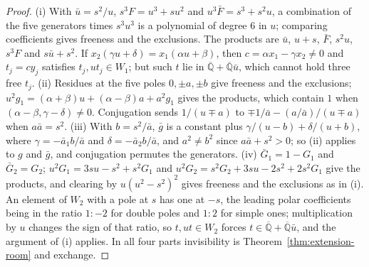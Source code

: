 \documentclass[11pt,a4paper]{article}
\theoremstyle{plain}
\theoremstyle{definition}
\newcommand{\Alg}{\overline{\mathbb{Q}}}
\begin{document}
\begin{proof}
(i) With $\bar u=s^{2}/u$, $s^{3}F=u^{3}+su^{2}$ and $u^{3}\bar F=s^{3}+s^{2}u$, a combination of the five generators
times $s^{3}u^{3}$ is a polynomial of degree $6$ in $u$; comparing coefficients gives freeness and the exclusions.
The products are $\bar u$, $u+s$, $\bar F$, $s^{2}u$, $s^{3}F$ and $s\bar u+s^{2}$. If $x_{2}(\gamma u+\delta)=
x_{1}(\alpha u+\beta)$, then $c=\alpha x_{1}-\gamma x_{2}\neq0$ and $t_{j}=cy_{j}$ satisfies $t_{j},ut_{j}\in W_{1}$;
but such $t$ lie in $\Alg+\Alg\bar u$, which cannot hold three free $t_{j}$. (ii) Residues at the five poles
$0,\pm a,\pm b$ give freeness and the exclusions; $u^{2}g_{1}=(\alpha+\beta)u+(\alpha-\beta)a+a^{2}g_{1}$ gives the
products, which contain $1$ when $(\alpha-\beta,\gamma-\delta)\neq0$. Conjugation sends $1/(u\mp a)$ to
$\mp1/\bar a-(a/\bar a)/(u\mp a)$ when $a\bar a=s^{2}$. (iii) With $b=s^{2}/\bar a$, $\bar g$ is a constant plus
$\gamma/(u-b)+\delta/(u+b)$, where $\gamma=-\bar a_{1}b/\bar a$ and $\delta=-\bar a_{2}b/\bar a$, and $a^{2}\neq b^{2}$
since $a\bar a+s^{2}>0$; so (ii) applies to $g$ and $\bar g$, and conjugation permutes the generators.
(iv) $\bar G_{1}=1-G_{1}$ and $\bar G_{2}=G_{2}$; $u^{2}G_{1}=3su-s^{2}+s^{2}G_{1}$ and
$u^{2}G_{2}=s^{2}G_{2}+3su-2s^{2}+2s^{2}G_{1}$ give the products, and clearing by $u(u^{2}-s^{2})^{2}$ gives
freeness and the exclusions as in (i). An element of $W_{2}$ with a pole at $s$ has one at $-s$, the leading
polar coefficients being in the ratio $1:-2$ for double poles and $1:2$ for simple ones; multiplication by $u$
changes the sign of that ratio, so $t,ut\in W_{2}$ forces $t\in\Alg+\Alg\bar u$, and the argument of (i)
applies. In all four parts invisibility is Theorem~\ref{thm:extension-room} and exchange.
\end{proof}
\end{document}
